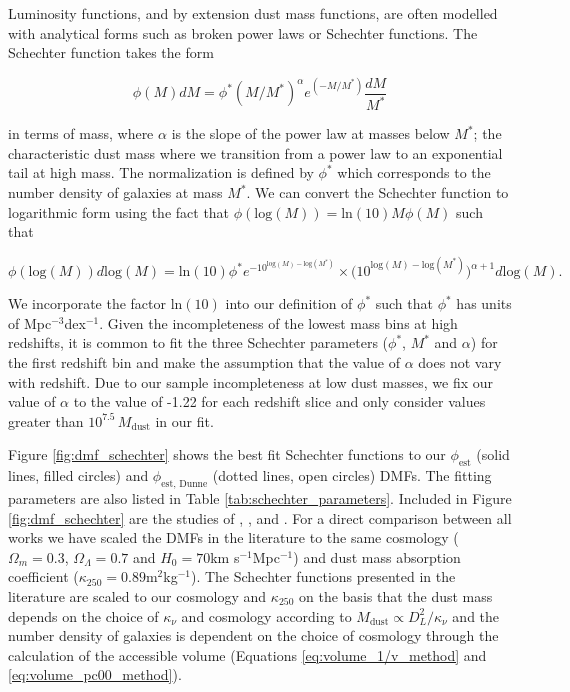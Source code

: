 Luminosity functions, and by extension dust mass functions, are often modelled with analytical forms such as broken power laws or Schechter functions. The Schechter function takes the form

\begin{equation}
    \phi(M) dM = \phi^* (M/M^*)^\alpha e^{(-M/M^*)}\frac{dM}{M^*}
    \label{eq:schechter_function}
\end{equation}

\noindent in terms of mass, where $\alpha$ is the slope of the power law at masses below $M^*$; the characteristic dust mass where we transition from a power law to an exponential tail at high mass. The normalization is defined by $\phi^*$ which corresponds to the number density of galaxies at mass $M^*$. We can convert the Schechter function to logarithmic form using the fact that $\phi(\textrm{log}(M)) = \textrm{ln}(10)M\phi(M)$ such that

\begin{equation}
    \phi(\textrm{log}(M)) d\textrm{log}(M) = \textrm{ln}(10)\phi^* e^{-10^{\textrm{log}(M)-\textrm{log}(M^*)}}\times \Bigg(10^{\textrm{log}(M)-\textrm{log}(M^*)}\Bigg)^{\alpha+1} d\textrm{log}(M).
    \label{eq:schechter_function_log}
\end{equation}

We incorporate the factor $\textrm{ln}(10)$ into our definition of $\phi^*$ such that $\phi^*$ has units of Mpc$^{-3}$dex$^{-1}$. Given the incompleteness of the lowest mass bins at high redshifts, it is common to fit the three Schechter parameters ($\phi^*$, $M^*$ and $\alpha$) for the first redshift bin and make the assumption that the value of $\alpha$ does not vary with redshift. Due to our sample incompleteness at low dust masses, we fix our value of $\alpha$ to the \citealt{Beeston_2018} value of -1.22 for each redshift slice and only consider values greater than $10^{7.5}\,M_{\textrm{dust}}$ in our fit.

Figure \ref{fig:dmf_schechter} shows the best fit Schechter functions to our $\phi_{\textrm{est}}$ (solid lines, filled circles) and $\phi_{\textrm{est, Dunne}}$ (dotted lines, open circles) DMFs. The fitting parameters are also listed in Table \ref{tab:schechter_parameters}. Included in Figure \ref{fig:dmf_schechter} are the studies of \citealt{Vlahakis_2005}, \citealt{Dunne_2011}, \citealt{Beeston_2018} and \citealt{Pozzi_2020}. For a direct comparison between all works we have scaled the DMFs in the literature to the same cosmology ($\Omega_m = 0.3$, $\Omega_\Lambda = 0.7$ and $H_0 = 70$km s$^{-1}$Mpc$^{-1}$) and dust mass absorption coefficient ($\kappa_{250} = 0.89$m$^{2}$kg$^{-1}$). The Schechter functions presented in the literature are scaled to our cosmology and $\kappa_{250}$ on the basis that the dust mass depends on the choice of $\kappa_\nu$ and cosmology according to $M_{\textrm{dust}} \propto D_L^2/\kappa_\nu$ and the number density of galaxies is dependent on the choice of cosmology through the calculation of the accessible volume (Equations \ref{eq:volume_1/v_method} and \ref{eq:volume_pc00_method}). 

